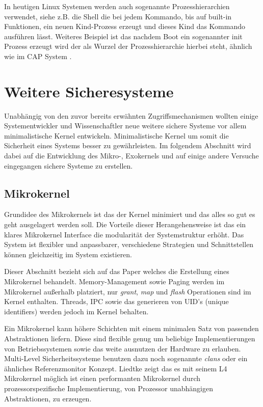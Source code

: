 \documentclass[german, 9pt,technote]{IEEEtran}
\begin{document}
		     In heutigen Linux Systemen werden auch sogenannte Prozesshierarchien verwendet, siehe z.B. die Shell die bei jedem
		     Kommando, bis auf built-in Funktionen, ein neuen Kind-Prozess erzeugt und dieses Kind das Kommando ausf\"uhren l\"asst. Weiteres Beispiel
		     ist das nachdem Boot ein sogenannter init Prozess erzeugt wird der als Wurzel der Prozesshierarchie hierbei steht, \"ahnlich wie 
		     im CAP System \cite{Url:linux:processes}.
		     
  \section{Weitere Sicheresysteme} \label{sec:other}
    Unabh\"angig von den zuvor bereits erw\"ahnten Zugriffsmechanismen wollten einige Systementwickler und Wissenschaftler neue weitere sichere Systeme
    vor allem minimalistische Kernel entwickeln. Minimalistische Kernel um somit die Sicherheit eines Systems besser zu gew\"ahrleisten.
    Im folgendem Abschnitt wird dabei auf die Entwicklung des Mikro-, Exokernels und auf einige andere Versuche eingegangen sichere Systeme zu erstellen.
    \subsection{Mikrokernel}
	    Grundidee des Mikrokernels ist das der Kernel minimiert und das alles so gut es geht ausgelagert werden soll.
	    Die Vorteile dieser Herangehensweise ist das ein klares Mikrokernel Interface die modularit\"at der Systemstruktur erh\"oht.
	    Das System ist flexibler und anpassbarer, verschiedene Strategien und Schnittstellen k\"onnen gleichzeitig im System existieren.
	    
	    Dieser Abschnitt bezieht sich auf das Paper \cite{inproc:micro} welches die Erstellung eines Mikrokernel behandelt.
	    Memory-Management sowie Paging werden im Mikrokernel au\ss erhalb platziert, nur \textit{grant}, \textit{map} und \textit{flash} Operationen sind im Kernel 
	    enthalten. \cite[S. 238 f]{inproc:micro} Threads, IPC sowie das generieren von UID's (unique identifiers) werden jedoch im Kernel behalten.
	    
	    Ein Mikrokernel kann h\"ohere Schichten mit einem minimalen Satz von passenden Abstraktionen liefern.
	    Diese sind flexible genug um beliebige Implementierungen von Betriebssystemen sowie das weite ausnutzen der Hardware zu erlauben.
	    Multi-Level Sicherheitssysteme benutzen dazu noch sogenannte \textit{clans} oder ein \"ahnliches Referenzmonitor Konzept.        
	    Liedtke zeigt das es mit seinem L4 Mikrokernel m\"oglich ist einen performanten Mikrokernel durch prozessorspezifische Implementierung, 
	    von Prozessor unabh\"angigen Abstraktionen, zu erzeugen.\cite[S. 248]{inproc:micro}
   
\end{document}
